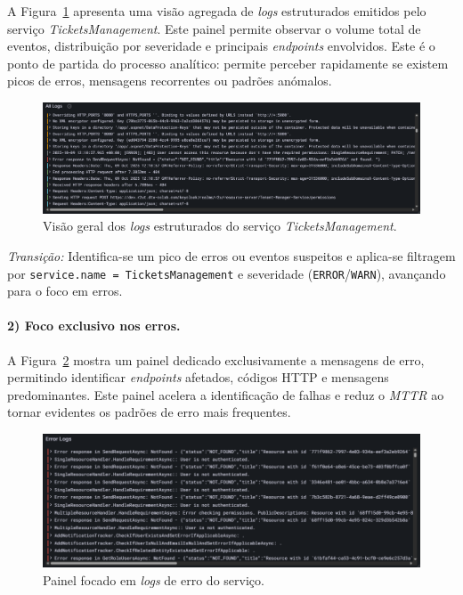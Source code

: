 A Figura~\ref{fig:dash-1} apresenta uma visão agregada de \textit{logs} estruturados emitidos pelo 
serviço \textit{TicketsManagement}. Este painel permite observar o volume total de eventos, 
distribuição por severidade e principais \textit{endpoints} envolvidos. Este é o ponto de partida do processo analítico: permite perceber rapidamente se existem picos de erros, mensagens recorrentes ou padrões anómalos.

\begin{figure}[H]
    \centering
    \includegraphics[width=\textwidth]{images/Grafana/all_logs_dashboard.png}
    \caption{Visão geral dos \textit{logs} estruturados do serviço \textit{TicketsManagement}.}
    \label{fig:dash-1}
\end{figure}

\textit{Transição:} Identifica-se um pico de erros ou eventos suspeitos e aplica-se filtragem 
por \texttt{service.name = TicketsManagement} e severidade (\texttt{ERROR}/\texttt{WARN}), avançando para o foco em erros.

\paragraph{2) Foco exclusivo nos erros.}

A Figura~\ref{fig:dash-2} mostra um painel dedicado exclusivamente a mensagens de erro, 
permitindo identificar \textit{endpoints} afetados, códigos HTTP e mensagens predominantes. 
Este painel acelera a identificação de falhas e reduz o \textit{MTTR} ao tornar evidentes os padrões de erro mais frequentes.

\begin{figure}[H]
    \centering
    \includegraphics[width=\textwidth]{images/Grafana/error_logs_dashboard.png}
    \caption{Painel focado em \textit{logs} de erro do serviço.}
    \label{fig:dash-2}
\end{figure}

